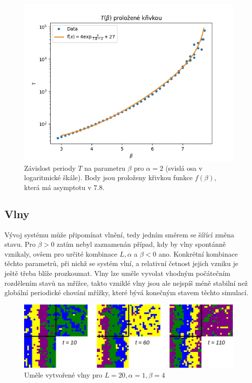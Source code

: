 \documentclass{article}
\begin{document}
\begin{figure}[H]
 \includegraphics{T_beta_fit}
 \caption{Závislost periody $T$ na parametru $\beta$ pro $\alpha = 2$ (svislá osa v logaritmické škále). Body jsou proloženy křivkou funkce $f(\beta)$, která má asymptotu v $7.8$.}
 \label{fig:T_beta_fit}
\end{figure}


\subsection{Vlny}
Vývoj systému může připomínat vlnění, tedy jedním směrem se šířící změna stavu. Pro $\beta > 0$ zatím nebyl zaznamenán případ, kdy by vlny spontánně vznikaly, ovšem pro určité kombinace $L, \alpha$ a $\beta < 0$ ano. Konkrétní kombinace těchto parametrů, při nichž se systém vlní, a relativní četnost jejich vzniku je ještě třeba blíže prozkoumat. Vlny lze uměle vyvolat vhodným počátečním rozdělením stavů na mřížce, takto vzniklé vlny jsou ale nejspíš méně stabilní než globální periodické chování mřížky, které bývá konečným stavem těchto simulací.
\begin{figure}[H]
 \includegraphics[scale=0.4]{induced_waves}
 \caption{Uměle vytvořené vlny pro $L = 20, \alpha = 1, \beta = 4$}
\end{figure}
\end{document}
